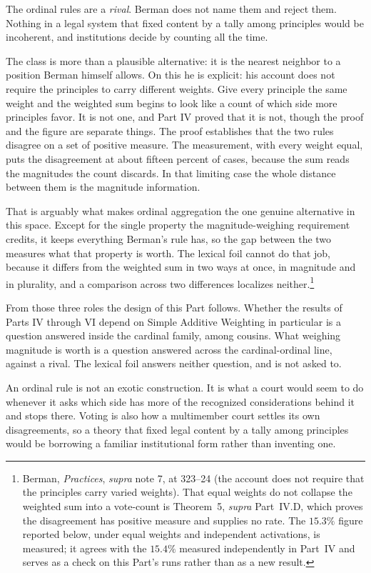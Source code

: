 The ordinal rules are a \textit{rival}. Berman does not name them and reject them. Nothing in a legal system that
fixed content by a tally among principles would be incoherent, and
institutions decide by counting all the time.

The class is more than a plausible alternative: it is the nearest
neighbor to a position Berman himself allows. On this he is explicit: his account does not require the principles to
carry different weights. Give every principle the same weight and the weighted
sum begins to look like a count of which side more principles favor. It is not one, and Part IV proved that it is not, though the proof and the
figure are separate things. The proof establishes that the two rules disagree
on a set of positive measure. The measurement, with every weight equal, puts
the disagreement at about fifteen percent of cases, because the
sum reads the magnitudes the count discards. In that limiting case the whole distance between them is the
magnitude information.

That is arguably what makes ordinal aggregation the one genuine alternative
in this space. Except for the single property the magnitude-weighing
requirement credits, it keeps everything Berman's rule has, so the gap between the two
measures what that property is worth. The lexical
foil cannot do that job, because it differs from the weighted sum in two
ways at once, in magnitude and in plurality, and a comparison across two
differences localizes neither.\footnote{Berman, \textit{Practices},
\textit{supra} note 7, at 323--24 (the account does not require that the
principles carry varied weights). That equal weights do not collapse the weighted sum into a vote-count is
Theorem~5, \textit{supra} Part~IV.D, which proves the disagreement has
positive measure and supplies no rate. The $15.3\%$ figure reported below,
under equal weights and independent activations, is measured; it agrees with
the $15.4\%$ measured independently in Part~IV and serves as a check on this
Part's runs rather than as a new result.}

From those three roles the design of this Part follows. Whether the
results of Parts IV through VI depend on Simple Additive Weighting in
particular is a question answered inside the cardinal family, among cousins. What weighing magnitude is
worth is a question answered across the cardinal-ordinal line, against a rival. The lexical foil answers
neither question, and is not asked to.

An ordinal rule is not an exotic construction. It is what a court would seem to do whenever it asks which side has more of
the recognized considerations behind it and stops there. Voting is also how a multimember court settles
its own disagreements, so a theory that fixed legal content by a tally
among principles would be borrowing a familiar institutional form rather
than inventing one.

